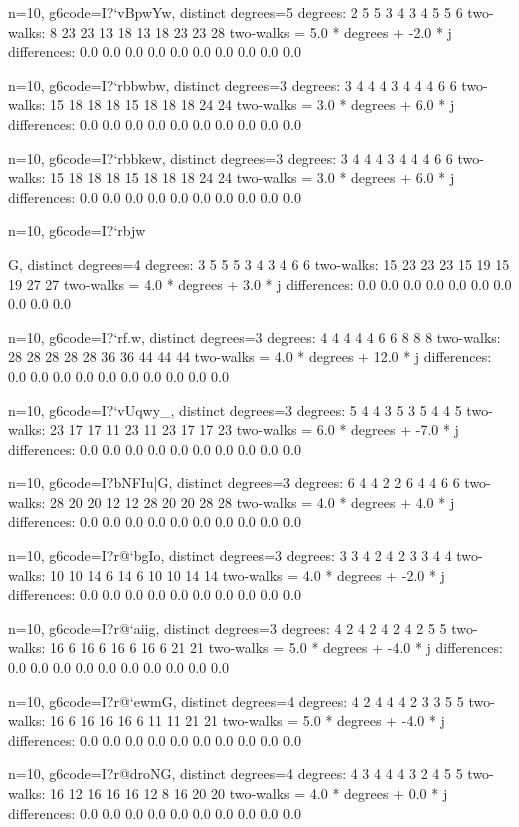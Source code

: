 {{{{{{{{{{{n=10, g6code=I?`vBpwYw, distinct degrees=5
degrees: 2 5 5 3 4 3 4 5 5 6 
two-walks: 8 23 23 13 18 13 18 23 23 28 
two-walks = 5.0 * degrees + -2.0 * j
differences: 0.0 0.0 0.0 0.0 0.0 0.0 0.0 0.0 0.0 0.0 

n=10, g6code=I?`rbbwbw, distinct degrees=3
degrees: 3 4 4 4 3 4 4 4 6 6 
two-walks: 15 18 18 18 15 18 18 18 24 24 
two-walks = 3.0 * degrees + 6.0 * j
differences: 0.0 0.0 0.0 0.0 0.0 0.0 0.0 0.0 0.0 0.0 

n=10, g6code=I?`rbbkew, distinct degrees=3
degrees: 3 4 4 4 3 4 4 4 6 6 
two-walks: 15 18 18 18 15 18 18 18 24 24 
two-walks = 3.0 * degrees + 6.0 * j
differences: 0.0 0.0 0.0 0.0 0.0 0.0 0.0 0.0 0.0 0.0 

n=10, g6code=I?`rbjw}G, distinct degrees=4
degrees: 3 5 5 5 3 4 3 4 6 6 
two-walks: 15 23 23 23 15 19 15 19 27 27 
two-walks = 4.0 * degrees + 3.0 * j
differences: 0.0 0.0 0.0 0.0 0.0 0.0 0.0 0.0 0.0 0.0 

n=10, g6code=I?`rf^^nw, distinct degrees=3
degrees: 4 4 4 4 4 6 6 8 8 8 
two-walks: 28 28 28 28 28 36 36 44 44 44 
two-walks = 4.0 * degrees + 12.0 * j
differences: 0.0 0.0 0.0 0.0 0.0 0.0 0.0 0.0 0.0 0.0 

n=10, g6code=I?`vUqwy_, distinct degrees=3
degrees: 5 4 4 3 5 3 5 4 4 5 
two-walks: 23 17 17 11 23 11 23 17 17 23 
two-walks = 6.0 * degrees + -7.0 * j
differences: 0.0 0.0 0.0 0.0 0.0 0.0 0.0 0.0 0.0 0.0 

n=10, g6code=I?bNFIu|G, distinct degrees=3
degrees: 6 4 4 2 2 6 4 4 6 6 
two-walks: 28 20 20 12 12 28 20 20 28 28 
two-walks = 4.0 * degrees + 4.0 * j
differences: 0.0 0.0 0.0 0.0 0.0 0.0 0.0 0.0 0.0 0.0 

n=10, g6code=I?r@`bgIo, distinct degrees=3
degrees: 3 3 4 2 4 2 3 3 4 4 
two-walks: 10 10 14 6 14 6 10 10 14 14 
two-walks = 4.0 * degrees + -2.0 * j
differences: 0.0 0.0 0.0 0.0 0.0 0.0 0.0 0.0 0.0 0.0 

n=10, g6code=I?r@`aiig, distinct degrees=3
degrees: 4 2 4 2 4 2 4 2 5 5 
two-walks: 16 6 16 6 16 6 16 6 21 21 
two-walks = 5.0 * degrees + -4.0 * j
differences: 0.0 0.0 0.0 0.0 0.0 0.0 0.0 0.0 0.0 0.0 

n=10, g6code=I?r@`ewmG, distinct degrees=4
degrees: 4 2 4 4 4 2 3 3 5 5 
two-walks: 16 6 16 16 16 6 11 11 21 21 
two-walks = 5.0 * degrees + -4.0 * j
differences: 0.0 0.0 0.0 0.0 0.0 0.0 0.0 0.0 0.0 0.0 

n=10, g6code=I?r@droNG, distinct degrees=4
degrees: 4 3 4 4 4 3 2 4 5 5 
two-walks: 16 12 16 16 16 12 8 16 20 20 
two-walks = 4.0 * degrees + 0.0 * j
differences: 0.0 0.0 0.0 0.0 0.0 0.0 0.0 0.0 0.0 0.0 

}}}}}}}}}}
